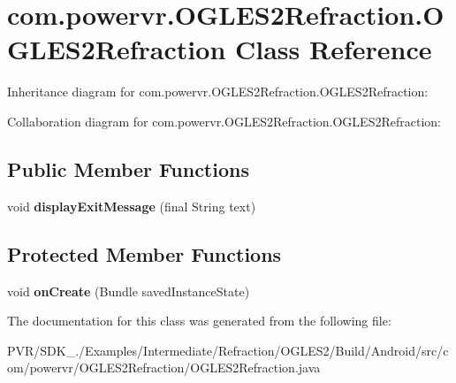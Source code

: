 \hypertarget{classcom_1_1powervr_1_1_o_g_l_e_s2_refraction_1_1_o_g_l_e_s2_refraction}{\section{com.\+powervr.\+O\+G\+L\+E\+S2\+Refraction.\+O\+G\+L\+E\+S2\+Refraction Class Reference}
\label{classcom_1_1powervr_1_1_o_g_l_e_s2_refraction_1_1_o_g_l_e_s2_refraction}
}


Inheritance diagram for com.\+powervr.\+O\+G\+L\+E\+S2\+Refraction.\+O\+G\+L\+E\+S2\+Refraction\+:


Collaboration diagram for com.\+powervr.\+O\+G\+L\+E\+S2\+Refraction.\+O\+G\+L\+E\+S2\+Refraction\+:
\subsection*{Public Member Functions}
\begin{DoxyCompactItemize}
\item 
\hypertarget{classcom_1_1powervr_1_1_o_g_l_e_s2_refraction_1_1_o_g_l_e_s2_refraction_a8a09ea61c2853c5b41ae6d88aaa789b3}{void {\bfseries display\+Exit\+Message} (final String text)}\label{classcom_1_1powervr_1_1_o_g_l_e_s2_refraction_1_1_o_g_l_e_s2_refraction_a8a09ea61c2853c5b41ae6d88aaa789b3}

\end{DoxyCompactItemize}
\subsection*{Protected Member Functions}
\begin{DoxyCompactItemize}
\item 
\hypertarget{classcom_1_1powervr_1_1_o_g_l_e_s2_refraction_1_1_o_g_l_e_s2_refraction_a59de1f6d5fc5a5fd3b162961175e5ba2}{void {\bfseries on\+Create} (Bundle saved\+Instance\+State)}\label{classcom_1_1powervr_1_1_o_g_l_e_s2_refraction_1_1_o_g_l_e_s2_refraction_a59de1f6d5fc5a5fd3b162961175e5ba2}

\end{DoxyCompactItemize}


The documentation for this class was generated from the following file\+:\begin{DoxyCompactItemize}
\item 
P\+V\+R/\+S\+D\+K\+\_./\+Examples/\+Intermediate/\+Refraction/\+O\+G\+L\+E\+S2/\+Build/\+Android/src/com/powervr/\+O\+G\+L\+E\+S2\+Refraction/O\+G\+L\+E\+S2\+Refraction.\+java\end{DoxyCompactItemize}

